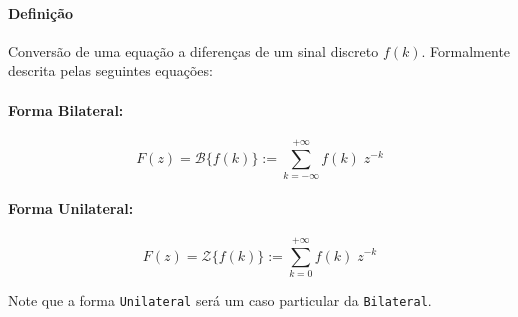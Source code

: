 \documentclass{article}
\begin{document}
    \paragraph{Definição}Conversão de uma equação a diferenças de um sinal discreto $f(k)$. Formalmente descrita pelas seguintes equações:
    \begin{multicols}{2}
        \raggedcolumns
        \paragraph{Forma Bilateral:}
        \begin{equation}
            \boxed{
                F(z) = \mathcal{B} \{ f(k) \} := \sum_{k=-\infty}^{+\infty} f(k) \; z^{-k}
            }
        \end{equation}
        \columnbreak
        \paragraph{Forma Unilateral:}
        \begin{equation}
            \boxed{
                F(z) = \mathcal{Z}\{ f(k) \} := \sum_{k=0}^{+\infty} f(k) \; z^{-k}
            }
        \end{equation}
    \end{multicols}\noindent
    Note que a forma \texttt{Unilateral} será um caso particular da \texttt{Bilateral}.
\end{document}
